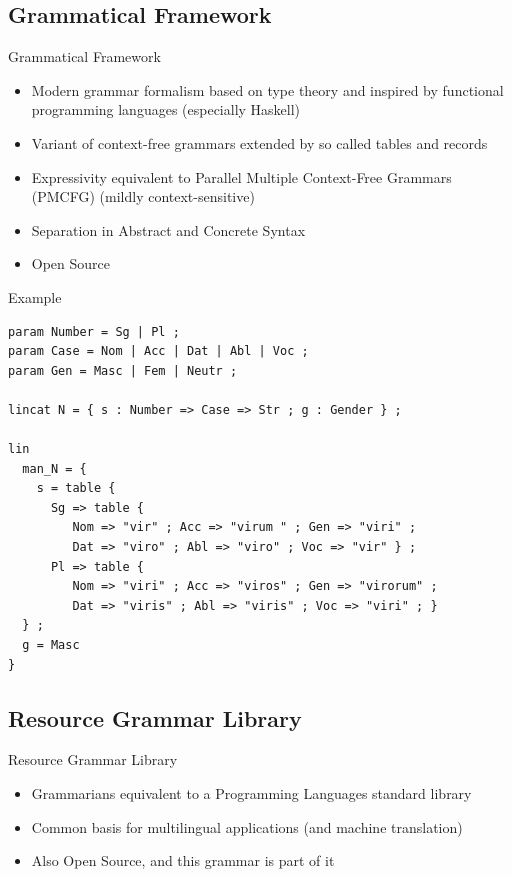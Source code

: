 \documentclass[compress,table]{beamer} %
\begin{document}
\subsection{Grammatical Framework}
\begin{frame}{Grammatical Framework}
  \begin{itemize}
  \item Modern grammar formalism based on type theory and inspired by functional programming languages (especially Haskell)
  \item Variant of context-free grammars extended by so called tables and records
  \item Expressivity equivalent to Parallel Multiple Context-Free Grammars (PMCFG) (mildly context-sensitive)
  \item Separation in Abstract and Concrete Syntax
  \item Open Source
  \end{itemize}
\end{frame}
\begin{frame}[fragile]{Example}
  \begin{lstlisting}
param Number = Sg | Pl ;
param Case = Nom | Acc | Dat | Abl | Voc ;
param Gen = Masc | Fem | Neutr ;

lincat N = { s : Number => Case => Str ; g : Gender } ;

lin
  man_N = {
    s = table {
      Sg => table {
         Nom => "vir" ; Acc => "virum " ; Gen => "viri" ;
         Dat => "viro" ; Abl => "viro" ; Voc => "vir" } ;
      Pl => table {
         Nom => "viri" ; Acc => "viros" ; Gen => "virorum" ;
         Dat => "viris" ; Abl => "viris" ; Voc => "viri" ; }
  } ;
  g = Masc
}
  \end{lstlisting}
\end{frame}

\subsection{Resource Grammar Library}

\begin{frame}{Resource Grammar Library}
  \begin{itemize}
  \item Grammarians equivalent to a Programming Languages standard library
  \item Common basis for multilingual applications (and machine translation)
  \item Also Open Source, and this grammar is part of it
  \end{itemize}
\end{frame}
\end{document}

